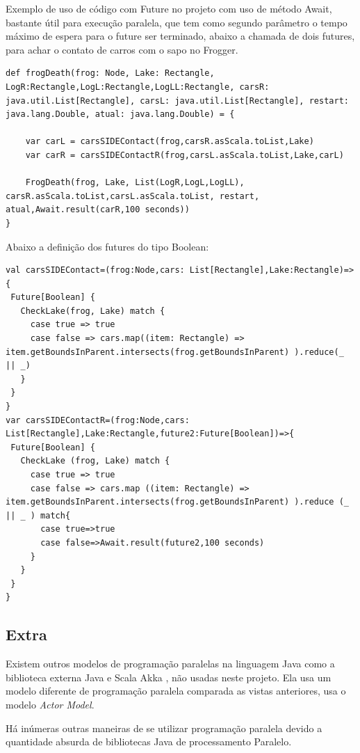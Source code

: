 \documentclass[rel-mlp]{iiufrgs}
\begin{document}
 Exemplo de uso de código com Future no projeto com uso de método Await, bastante útil para execução paralela, que tem como segundo parâmetro o tempo máximo de espera para o future ser terminado, abaixo a chamada de dois futures, para achar o contato de carros com o sapo no Frogger.
 
 \begin{lstlisting}
def frogDeath(frog: Node, Lake: Rectangle, LogR:Rectangle,LogL:Rectangle,LogLL:Rectangle, carsR: java.util.List[Rectangle], carsL: java.util.List[Rectangle], restart: java.lang.Double, atual: java.lang.Double) = {
    
    var carL = carsSIDEContact(frog,carsR.asScala.toList,Lake)
    var carR = carsSIDEContactR(frog,carsL.asScala.toList,Lake,carL)
    
    FrogDeath(frog, Lake, List(LogR,LogL,LogLL), carsR.asScala.toList,carsL.asScala.toList, restart, atual,Await.result(carR,100 seconds))
}
\end{lstlisting}

Abaixo a definição dos futures do tipo Boolean:

\lstset{style = MyJava}
\begin{lstlisting}
val carsSIDEContact=(frog:Node,cars: List[Rectangle],Lake:Rectangle)=>{
 Future[Boolean] {
   CheckLake(frog, Lake) match {
     case true => true
     case false => cars.map((item: Rectangle) => item.getBoundsInParent.intersects(frog.getBoundsInParent) ).reduce(_ || _)
   }
 }
}
var carsSIDEContactR=(frog:Node,cars: List[Rectangle],Lake:Rectangle,future2:Future[Boolean])=>{
 Future[Boolean] {
   CheckLake (frog, Lake) match {
     case true => true
     case false => cars.map ((item: Rectangle) => item.getBoundsInParent.intersects(frog.getBoundsInParent) ).reduce (_ || _ ) match{
       case true=>true
       case false=>Await.result(future2,100 seconds)
     }
   }
 }
}
 \end{lstlisting}
 
 \subsection{Extra}
 Existem outros modelos de programação paralelas na linguagem Java como a biblioteca externa Java e Scala Akka \cite{akka}, não usadas neste projeto. Ela usa um modelo diferente de programação paralela comparada as vistas anteriores, usa o modelo \textit{Actor Model}.

 Há inúmeras outras maneiras de se utilizar programação paralela devido a quantidade absurda de bibliotecas Java de processamento Paralelo.
\end{document}
